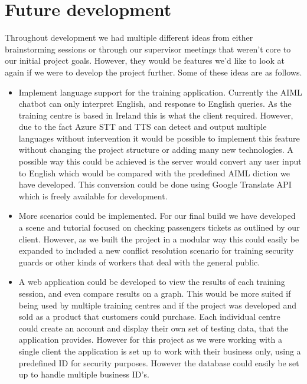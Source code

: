\section{Future development}
Throughout development we had multiple different ideas from either brainstorming sessions or through our supervisor meetings that weren't core to our initial project goals. However, they would be features we'd like to look at again if we were to develop the project further. Some of these ideas are as follows.
\begin{itemize}
    \item Implement language support for the training application. Currently the AIML chatbot can only interpret English, and response to English queries. As the training centre is based in Ireland this is what the client required. However, due to the fact Azure STT and TTS can detect and output multiple languages without intervention it would be possible to implement this feature without changing the project structure or adding many new technologies. A possible way this could be achieved is the server would convert any user input to English which would be compared with the predefined AIML diction we have developed. This conversion could be done using Google Translate API which is freely available for development.
    
    \item More scenarios could be implemented. For our final build we have developed a scene and tutorial focused on checking passengers tickets as outlined by our client. However, as we built the project in a modular way this could easily be expanded to included a new conflict resolution scenario for training security guards or other kinds of workers that deal with the general public. 
    
    \item A web application could be developed to view the results of each training session, and even compare results on a graph. This would be more suited if being used by multiple training centres and if the project was developed and sold as a product that customers could purchase. Each individual centre could create an account and display their own set of testing data, that the application provides. However for this project as we were working with a single client the application is set up to work with their business only, using a predefined ID for security purposes. However the database could easily be set up to handle multiple business ID's.
    
\end{itemize}

